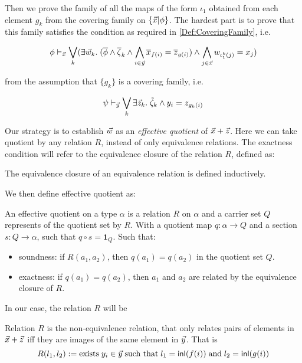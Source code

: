 Then we prove the family of all the maps of the form $\iota_1$ obtained from each element $g_k$ from the covering family on $\{ \vec{x} | \phi \}$.
The hardest part is to prove that this family satisfies the condition as required in \ref{Def:CoveringFamily}, i.e.

\begin{equation}
\phi \vdash_{\vec{x}} \bigvee_k (\exists\vec{w}_k.\;(\overline{\phi}\land \overline{\zeta}_k \land\bigwedge_{i\in \vec{y}} \overline{x}_{f(i)} = \overline{z}_{g(i)}) \land \bigwedge_{j\in\vec{x}}w_{{\iota^k_1(j)}} = x_j )
\end{equation}

from the assumption that $\{g_k\}$ is a covering family, i.e.

\[\psi\vdash_{\vec{y}} \bigvee_k \exists \vec{z}_k.\; \tilde{\zeta}_k\land y_i = z_{g_k(i)}\]

  
Our strategy is to establish $\vec{w}$ as an \emph{effective quotient} of $\vec{x}+ \vec{z}$. 
Here we can take quotient by any relation $R$, instead of only equivalence relations. 
The exactness condition will refer to the equivalence closure of the relation $R$, defined as:

\begin{definition}
  The equivalence closure of an equivalence relation is defined inductively.
  \leanok
\end{definition}

We then define effective quotient as:

\begin{definition}
  \leanok
  An effective quotient on a type $\alpha$ is a relation $R$ on $\alpha$ and a carrier set $Q$ represents of the quotient
  set by $R$. With a quotient map $q:\alpha\to Q$ and a section $s:Q\to \alpha$, such that $q\circ s = \mathbf{1}_Q$. Such that:
  \begin{itemize}
    \item soundness: if $R(a_1,a_2)$, then $q(a_1) = q(a_2)$ in the quotient set $Q$.
    \item exactness: if $q(a_1) = q(a_2)$, then $a_1$ and $a_2$ are related by the equivalence closure of $R$.
  \end{itemize}

\end{definition}

In our case, the relation $R$ will be 



\begin{definition}[Relation defined by the equalities in $f(i) = g(i)$]
  Relation $R$ is the non-equivalence relation, that only relates pairs of elements in $\vec{x}+\vec{z}$ 
  iff they are images of the same element in $\vec{y}$. That is 
  \begin{equation}
    R(l_1,l_2):= \text{exists}\; y_i \in \vec{y} \;\text{such that}\; l_1 = \mathsf{inl}(f(i))\; \text{and}\;  l_2 = \mathsf{inl}(g(i))
  \end{equation}
\end{definition}

